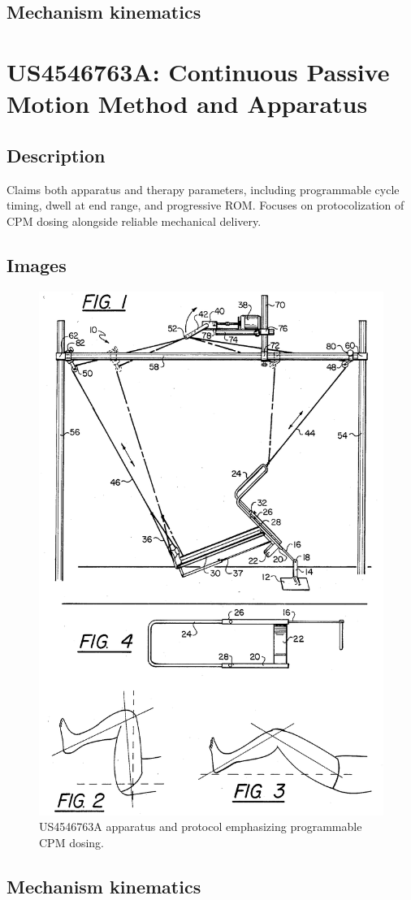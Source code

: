 \documentclass[11pt]{article}
\begin{document}
\subsection{Mechanism kinematics}

\section{US4546763A: Continuous Passive Motion Method and Apparatus}
\subsection{Description}
Claims both apparatus and therapy parameters, including programmable cycle timing, dwell at end range, and progressive ROM. Focuses on protocolization of CPM dosing alongside reliable mechanical delivery.
\subsection{Images}
\begin{figure}[H]
  \centering
  \includegraphics[width=0.54\linewidth]{US4546763-drawings-page-2.png}
  \caption{US4546763A apparatus and protocol emphasizing programmable CPM dosing.}
  \label{fig:US4546763A}
\end{figure}

\subsection{Mechanism kinematics}
\end{document}
